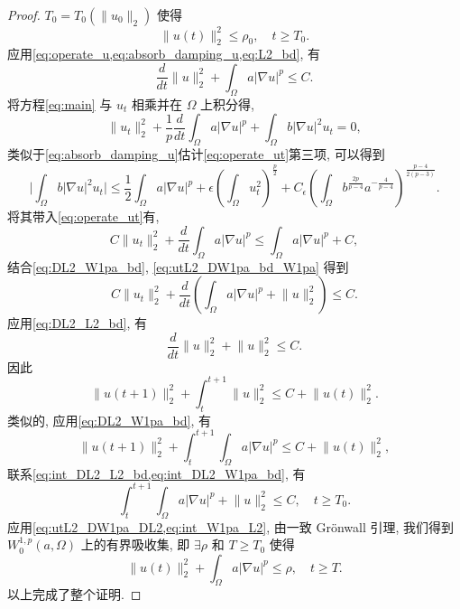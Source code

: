 \documentclass[oneside,longtitle]{LZUthesis}
\numberwithin{equation}{chapter}
\newcommand*\abs[1]{\lvert#1\rvert}
\newcommand*\norm[1]{\lVert#1\rVert}
\begin{document}
\begin{proof}
	$T_0 = T_0(\norm{u_0}_2)$ 使得
	\begin{equation}\label{eq:L2_bd}
		\norm{u(t)}_2^2 \leq \rho_0 , \quad t \geq T_0.
	\end{equation}
	应用\cref{eq:operate_u,eq:absorb_damping_u,eq:L2_bd}, 有
	\begin{equation}\label{eq:DL2_W1pa_bd}
		\frac{d}{dt}\norm{u}_2^2 + \int_{\Omega}a \abs{\nabla u}^p \leq C.
	\end{equation}
	将方程\eqref{eq:main} 与 $u_{t}$ 相乘并在 $\Omega$ 上积分得,
	\begin{equation}\label{eq:operate_ut}
		\norm{u_t}_2^2
		+ \frac{1}{p}\frac{d}{dt}\int_{\Omega}a \abs{\nabla u}^p
		+ \int_{\Omega}b \abs{\nabla u}^2 u_t
		= 0,
	\end{equation}
	类似于\cref{eq:absorb_damping_u}估计\cref{eq:operate_ut}第三项, 可以得到
	\begin{equation*}
			\abs{\int_{\Omega}b\abs{\nabla u}^2 u_t}
			\leq \frac{1}{2}\int_{\Omega}a\abs{\nabla u}^p
			+ \epsilon \left(\int_{\Omega}u_t^2\right)^{\frac{p}{2}}
			+ C_{\epsilon}\left(\int_{\Omega}b^{\frac{2p}{p-4}}a^{-\frac{4}{p-4}}\right)^{\frac{p-4}{2(p-3)}}.
	\end{equation*}
	将其带入\cref{eq:operate_ut}有,
	\begin{equation}\label{eq:utL2_DW1pa_bd_W1pa}
		C\norm{u_t}_2^2
		+ \frac{d}{dt}\int_{\Omega}a \abs{\nabla u}^p
		\leq \int_{\Omega}a \abs{\nabla u}^p
		+ C,
	\end{equation}
	结合\cref{eq:DL2_W1pa_bd}, \cref{eq:utL2_DW1pa_bd_W1pa} 得到
	\begin{equation}\label{eq:utL2_DW1pa_DL2}
		C\norm{u_t}_2^2
		+ \frac{d}{dt}\left(\int_{\Omega}a \abs{\nabla u}^p
		+ \norm{u}_2^2\right)
		\leq C.
	\end{equation}
	应用\cref{eq:DL2_L2_bd}, 有
	\begin{equation*}
		\frac{d}{dt}\norm{u}_2^2 + \norm{u}_2^2 \leq C.
	\end{equation*}
	因此
	\begin{equation}\label{eq:int_DL2_L2_bd}
		\norm{u(t+1)}_2^2
		+ \int_t^{t+1}\norm{u}_2^2
		\leq C + \norm{u(t)}_2^2.
	\end{equation}
	类似的, 应用\cref{eq:DL2_W1pa_bd}, 有
	\begin{equation}\label{eq:int_DL2_W1pa_bd}
		\norm{u(t+1)}_2^2
		+ \int_t^{t+1}\int_{\Omega}a \abs{\nabla u}^p
		\leq C + \norm{u(t)}_2^2,
	\end{equation}
	联系\cref{eq:int_DL2_L2_bd,eq:int_DL2_W1pa_bd}, 有
	\begin{equation}\label{eq:int_W1pa_L2}
		\int_t^{t+1}\int_{\Omega}a \abs{\nabla u}^p
		+ \norm{u}_2^2 \leq C , \quad t \geq T_0.
	\end{equation}
	应用\cref{eq:utL2_DW1pa_DL2,eq:int_W1pa_L2}, 由一致 Gr\"onwall 引理, 我们得到 $W_0^{1,p}(a,\Omega)$ 上的有界吸收集,
	即 $\exists \rho$ 和 $T \geq T_{0}$ 使得
	\begin{equation}\label{eq:uL2_W1pa_bd}
		\norm{u(t)}_2^2 + \int_{\Omega}a\abs{\nabla u}^p \leq \rho , \quad t \geq T.
	\end{equation}
	以上完成了整个证明.
\end{proof}
\end{document}
